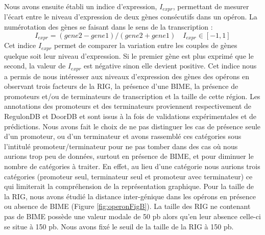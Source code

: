 \documentclass[12pt,a4paper]{report}
\begin{document}
\begin{onehalfspace}
Nous avons ensuite établi un indice d'expression, $I_{expr}$, permettant de mesurer l'écart entre le niveau d'expression de deux gènes consécutifs dans un opéron. La numérotation des gènes se faisant dans le sens de la transcription :
\[ I_{expr} = (gene2 - gene1) / (gene2 + gene1) \quad I_{expr} \in [-1,1]\]
Cet indice $I_{expr}$ permet de comparer la variation entre les couples de gènes quelque soit leur niveau d'expression. Si le premier gène est plus exprimé que le second, la valeur de $I_{expr}$ est négative sinon elle devient positive. Cet indice nous a permis de nous intéresser aux niveaux d'expression des gènes des opérons en observant trois facteurs de la RIG, la présence d'une BIME, la présence de promoteurs et/ou de terminateurs de transcription et la taille de cette région. Les annotations des promoteurs et des terminateurs proviennent respectivement de RegulonDB et DoorDB et sont issus à la fois de validations expérimentales et de prédictions. Nous avons fait le choix de ne pas distinguer les cas de présence seule d'un promoteur, ou d'un terminateur et avons rassemblé ces catégories sous l'intitulé promoteur/terminateur pour ne pas tomber dans des cas où nous aurions trop peu de données, surtout en présence de BIME, et pour diminuer le nombre de catégories à traiter. En effet, au lieu d'une catégorie nous aurions trois catégories (promoteur seul, terminateur seul et promoteur avec terminateur) ce qui limiterait la compréhension de la représentation graphique. Pour la taille de la RIG, nous avons étudié la distance inter-génique dans les opérons en présence ou absence de BIME (Figure \autoref{fig:operonFigB}). La taille des RIG ne contenant pas de BIME possède une valeur modale de 50 pb alors qu'en leur absence celle-ci se situe à 150 pb. Nous avons fixé le seuil de la taille de la RIG à 150 pb.


\end{onehalfspace}
\end{document}
